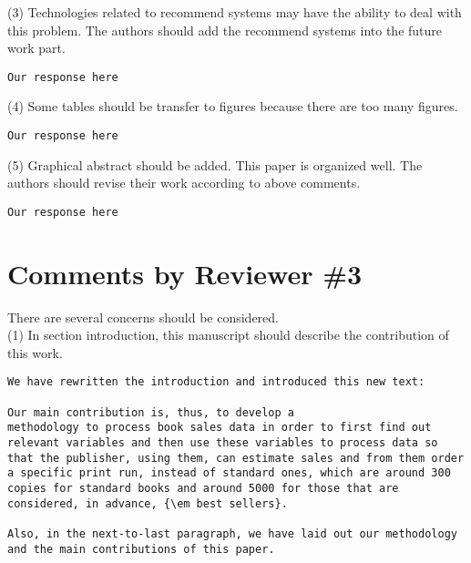 \documentclass[preprint]{elsarticle}
\begin{document}
\noindent (3) Technologies related to recommend systems may have the ability to deal with this problem. The authors should add the recommend systems into the future work part.\\

\begin{verbatim}
Our response here
\end{verbatim}


\noindent (4) Some tables should be transfer to figures because there are too many figures.\\

\begin{verbatim}
Our response here
\end{verbatim}


\noindent (5) Graphical abstract should be added. This paper is organized well. The authors should revise their work according to above comments.\\

\begin{verbatim}
Our response here
\end{verbatim}



\section{Comments by Reviewer \#3}

\noindent There are several concerns should be considered. \\


\noindent (1) In section introduction, this manuscript should describe the contribution of this work.\\

\begin{verbatim}
We have rewritten the introduction and introduced this new text:

Our main contribution is, thus, to develop a
methodology to process book sales data in order to first find out
relevant variables and then use these variables to process data so
that the publisher, using them, can estimate sales and from them order
a specific print run, instead of standard ones, which are around 300
copies for standard books and around 5000 for those that are
considered, in advance, {\em best sellers}.

Also, in the next-to-last paragraph, we have laid out our methodology 
and the main contributions of this paper.

\end{verbatim}
\end{document}
